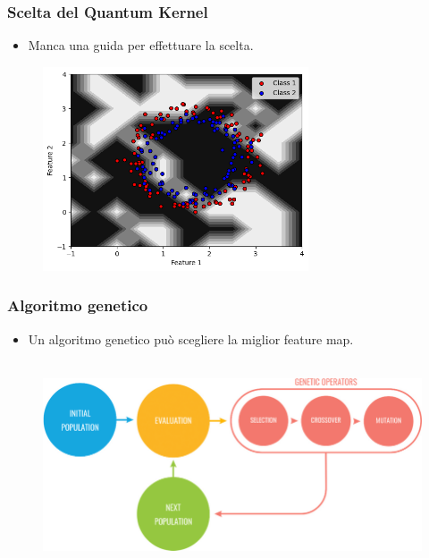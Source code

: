\documentclass{beamer}
\begin{document}
\begin{frame}
  \frametitle{Scelta del Quantum Kernel}
  \begin{itemize}
    \item Manca una guida per effettuare la scelta.
  \end{itemize}
        \begin{figure}
          \includegraphics[width=0.7\textwidth]{images/failcircle.png}
        \end{figure}
\end{frame}



\begin{frame}
  \frametitle{Algoritmo genetico}
  \begin{itemize}
    \item Un algoritmo genetico può scegliere la miglior feature map.\\\,
  \end{itemize}

  \begin{figure}
    \includegraphics[width=\textwidth]{images/genetic.png}
  \end{figure} 
\end{frame}
\end{document}
